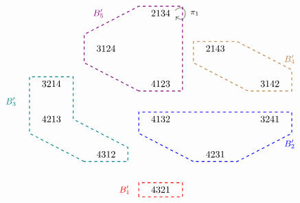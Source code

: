 \documentclass[12pt, reqno]{amsart}
\theoremstyle{definition}
\numberwithin{equation}{section} \numberwithin{figure}{section}
\numberwithin{table}{section}
\begin{document}
\begin{figure}[t]
\[
\def \vp {1.3}
\def \hp {2}
\begin{tikzpicture}
\node[right] at (-1.3*\hp, 0*\vp) {\textcolor{violet}{\small $B'_5$}};
\draw[violet, dashed, thick] (-0.4*\hp, -2.2*\vp) -- (-1.4*\hp, -1.4*\vp) -- (-1.4*\hp, -0.6*\vp) -- (-0.4*\hp, 0.2*\vp) -- (0.4*\hp, 0.2*\vp) -- (0.4*\hp, -2.2*\vp) -- (-0.4*\hp, -2.2*\vp);


\node[right] at (2.2*\hp, -1.3*\vp) {\textcolor{brown}{\small $B'_4$}};
\draw[brown, dashed, thick] (1.6*\hp, -2.2*\vp) -- (0.6*\hp, -1.4*\vp) -- (0.6*\hp, -0.8*\vp) -- (1.4*\hp, -0.8*\vp) -- (2.4*\hp, -1.6*\vp) -- (2.4*\hp, -2.2*\vp) -- (1.6*\hp, -2.2*\vp);



\node[right] at (-2.9*\hp, -2.5*\vp) {\textcolor{teal}{\small $B'_3$}};
\draw[teal, dashed, thick] (-1.4*\hp, -4.2*\vp) -- (-2.4*\hp, -3.4*\vp) -- (-2.4*\hp, -1.8*\vp) -- (-1.6*\hp, -1.8*\vp) -- (-1.6*\hp, -3*\vp) -- (-0.6*\hp, -3.8*\vp) -- (-0.6*\hp, -4.2*\vp) -- (-1.4*\hp, -4.2*\vp);


\node[right] at (2.2*\hp, -3.7*\vp) {\textcolor{blue}{\small $B'_2$}};
\draw[blue, dashed, thick] (0.6*\hp, -4.2*\vp) -- (-0.4*\hp, -3.4*\vp) -- (-0.4*\hp, -2.8*\vp) -- (2.4*\hp, -2.8*\vp) -- (2.4*\hp, -3.4*\vp) -- (1.4*\hp, -4.2*\vp) -- (0.6*\hp, -4.2*\vp);


\node[left] at (-0.5*\hp, -5*\vp) {\textcolor{red}{\small $B'_1$}};
\draw[red, dashed, thick]
(-0.4*\hp, -5.2*\vp)-- (-0.4*\hp, -4.8*\vp) -- (0.4*\hp, -4.8*\vp) -- (0.4*\hp, -5.2*\vp) -- (-0.4*\hp, -5.2*\vp);



\node[] at (0*\hp, 0*\vp) {$2134$};

\node[] at (-1*\hp, -1*\vp) {$3124$};
\node[] at (1*\hp, -1*\vp) {$2143$};

\node[] at (-2*\hp, -2*\vp) {$3214$};
\node[] at (0*\hp, -2*\vp) {$4123$};
\node[] at (2*\hp, -2*\vp) {$3142$};

\node[] at (-2*\hp, -3*\vp) {$4213$};
\node[] at (-0*\hp, -3*\vp) {$4132$};
\node[] at (2*\hp, -3*\vp) {$3241$};

\node[] at (-1*\hp, -4*\vp) {$4312$};
\node[] at (1*\hp, -4*\vp) {$4231$};


\node[] at (0*\hp, -5*\vp) {$4321$};

\node at (0*\hp + 0.2*\hp, 0*\vp) {} edge [out=40,in=320, loop] ();
\node at (0*\hp + 0.625*\hp, 0*\vp) {\footnotesize $\pi_1$};


\end{tikzpicture}\]
\end{figure}
\end{document}
